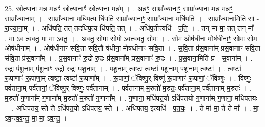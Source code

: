 \documentclass[17pt]{extarticle}
\begin{document}
25. स्रो॒त्याना॒ मन्न॒ मन्नꣳ॑ स्रो॒त्यानाꣳ॑ स्रो॒त्याना॒ मन्न᳚म् । . अन्नꣳ॒॒ साम्रा᳚ज्यानाꣳ॒॒ साम्रा᳚ज्याना॒ मन्न॒ मन्नꣳ॒॒ साम्रा᳚ज्यानाम् । . साम्रा᳚ज्याना॒ मधि॑प॒त्य धि॑पति॒ साम्रा᳚ज्यानाꣳ॒॒ साम्रा᳚ज्याना॒ मधि॑पति । . साम्रा᳚ज्याना॒मिति॒ सां - रा॒ज्या॒ना॒म् । . अधि॑पति॒ तत् तदधि॑प॒त्य धि॑पति॒ तत् । . अधि॑प॒तीत्यधि॑ - प॒ति॒ । . तन् मा॑ मा॒ तत् तन् मा᳚ । . मा॒ ऽव॒ त्व॒व॒तु॒ मा॒ मा॒ ऽव॒तु॒ । . अ॒व॒तु॒ सोमः॒ सोमो॑ ऽवत्ववतु॒ सोमः॑ । . सोम॒ ओष॑धीना॒ मोष॑धीनाꣳ॒॒ सोमः॒ सोम॒ ओष॑धीनाम् । . ओष॑धीनाꣳ सवि॒ता स॑वि॒तौ ष॑धीना॒ मोष॑धीनाꣳ सवि॒ता । . स॒वि॒ता प्र॑स॒वाना᳚म् प्रस॒वानाꣳ॑ सवि॒ता स॑वि॒ता प्र॑स॒वाना᳚म् । . प्र॒स॒वानाꣳ॑ रु॒द्रो रु॒द्रः प्र॑स॒वाना᳚म् प्रस॒वानाꣳ॑ रु॒द्रः । . प्र॒स॒वाना॒मिति॑ प्र - स॒वाना᳚म् । . रु॒द्रः प॑शू॒नाम् प॑शू॒नाꣳ रु॒द्रो रु॒द्रः प॑शू॒नाम् । . प॒शू॒नाम् त्वष्टा॒ त्वष्टा॑ पशू॒नाम् प॑शू॒नाम् त्वष्टा᳚ । . त्वष्टा॑ रू॒पाणाꣳ॑ रू॒पाणा॒म् त्वष्टा॒ त्वष्टा॑ रू॒पाणा᳚म् । . रू॒पाणां॒ ॅविष्णु॒र् विष्णू॑ रू॒पाणाꣳ॑ रू॒पाणां॒ ॅविष्णुः॑ । . विष्णुः॒ पर्व॑ताना॒म् पर्व॑तानां॒ ॅविष्णु॒र् विष्णुः॒ पर्व॑तानाम् । . पर्व॑तानाम् म॒रुतो॑ म॒रुतः॒ पर्व॑ताना॒म् पर्व॑तानाम् म॒रुतः॑ । . म॒रुतो॑ ग॒णाना᳚म् ग॒णाना᳚म् म॒रुतो॑ म॒रुतो॑ ग॒णाना᳚म् । . ग॒णाना॒ मधि॑पत॒यो ऽधि॑पतयो ग॒णाना᳚म् ग॒णाना॒ मधि॑पतयः । . अधि॑पतय॒ स्ते ते ऽधि॑पत॒यो ऽधि॑पतय॒ स्ते । . अधि॑पतय॒ इत्यधि॑ - प॒त॒यः॒ । . ते मा॑ मा॒ ते ते मा᳚ । . मा॒ ऽव॒न्त्व॒व॒न्तु॒ मा॒ मा॒ ऽव॒न्तु॒ । \newline
\end{document}
